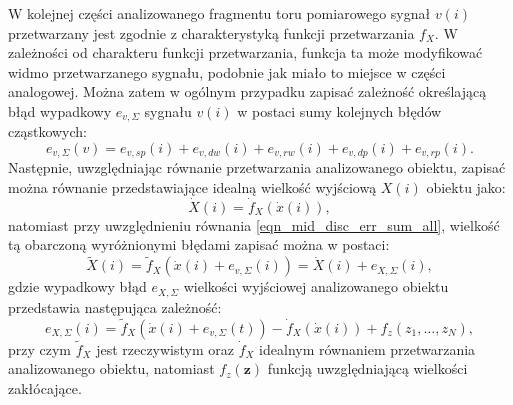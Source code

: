 W kolejnej części analizowanego fragmentu toru pomiarowego sygnał $v(i)$ przetwarzany jest zgodnie z charakterystyką funkcji przetwarzania $f_{X}$. W zależności od charakteru funkcji przetwarzania, funkcja ta może modyfikować widmo przetwarzanego sygnału, podobnie jak miało to miejsce w części analogowej. Można zatem w ogólnym przypadku zapisać zależność określającą błąd wypadkowy $e_{v,\Sigma}$ sygnału $v(i)$ w postaci sumy kolejnych błędów cząstkowych:
\begin{equation}
e_{v,\Sigma}(v) = e_{v,sp}(i) + e_{v,dw}(i) + e_{v,rw}(i) + e_{v,dp}(i) + e_{v,rp}(i) \label{eqn_mid_disc_err_sum_all}.
\end{equation}
Następnie, uwzględniając równanie przetwarzania analizowanego obiektu, zapisać można równanie przedstawiające idealną wielkość wyjściową $X(i)$ obiektu jako:
\begin{equation}
\dot{X}(i) = \dot{f}_{X} \left( \dot{x}(i) \right) \label{eqn_out_disc_ideal_all},
\end{equation}
natomiast przy uwzględnieniu równania \eqref{eqn_mid_disc_err_sum_all}, wielkość tą obarczoną wyróżnionymi błędami zapisać można w postaci:
\begin{equation}
\tilde{X}(i) = \tilde{f}_{X} \left( \dot{x}(i) + e_{v,\Sigma}(i) \right) = \dot{X}(i) + e_{X,\Sigma}(i) \label{eqn_out_disc_real_all},
\end{equation}
gdzie wypadkowy błąd $e_{X,\Sigma}$ wielkości wyjściowej analizowanego obiektu przedstawia następująca zależność:
\begin{equation}
e_{X,\Sigma}(i) = \tilde{f}_{X} \left( \dot{x}(i) + e_{v,\Sigma}(t) \right) - \dot{f}_{X} \left( \dot{x}(i) \right) + f_{z}(z_{1}, \hdots, z_{N}) \label{eqn_out_disc_err_sum_all},
\end{equation}
przy czym $\tilde{f}_{X}$ jest rzeczywistym oraz $\dot{f}_{X}$ idealnym równaniem przetwarzania analizowanego obiektu, natomiast $f_{z}(\mathbf{z})$ funkcją uwzględniającą wielkości zakłócające.

